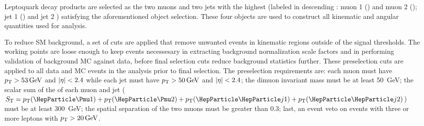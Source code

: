 Leptoquark decay products are selected as the two muons and two jets with the highest \pt (labeled in descending \pt: muon 1 (\PmuOne) and muon 2 (\PmuTwo); jet 1 (\PjOne) and jet 2 \PjTwo) satisfying the aforementioned object selection. These four objects are used to construct all kinematic and angular quantities used for analysis. 

To reduce SM background, a set of cuts are applied that remove unwanted events in kinematic regions outside of the signal thresholds. The working points are loose enough to keep events necessesary in extracting background normalization scale factors and in performing validation of background MC against data, before final selection cuts reduce background statistics further. These preselection cuts are applied to all data and MC events in the analysis prior to final selection. The preselection requirements are: each muon must have $\pt > \SI{53}{\GeV}$ and $\lvert \eta \rvert < 2.4$ while each jet must have $\pt > \SI{50}{\GeV}$ and $\lvert \eta \rvert< 2.4$; the dimuon invariant mass \Muu must be at least \SI{50}{\GeV}; the scalar sum of the \pt of each muon and jet ($\ST = \pt(\PmuOne) + \pt(\PmuTwo) + \pt(\PjOne) + \pt(\PjTwo)$) must be at least \SI{300}{\GeV}; the spatial separation \DR of the two muons must be greater than 0.3; last, an event veto on events with three or more leptons with $\pt > \SI{20}{\GeV}$.
